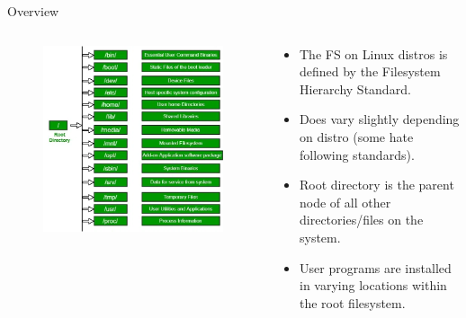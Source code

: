 \documentclass{beamer}
\begin{document}
\begin{frame}{Overview}
	\begin{columns}
		\begin{column}{0.5\textwidth}
			\begin{figure}
				\centering
				\includegraphics[width=\textwidth]{fhs.png}
			\end{figure}
		\end{column}
		\begin{column}{0.5\textwidth}
			\begin{itemize}
				\item The FS on Linux distros is defined by the Filesystem
					Hierarchy Standard.
					\pause

				\item Does vary slightly depending on distro (some hate
					following standards).
					\pause

				\item Root directory is the parent node of all other
					directories/files on the system.
					\pause

				\item User programs are installed in varying locations within
					the root filesystem.
			\end{itemize}
		\end{column}
	\end{columns}
\end{frame}
\end{document}
